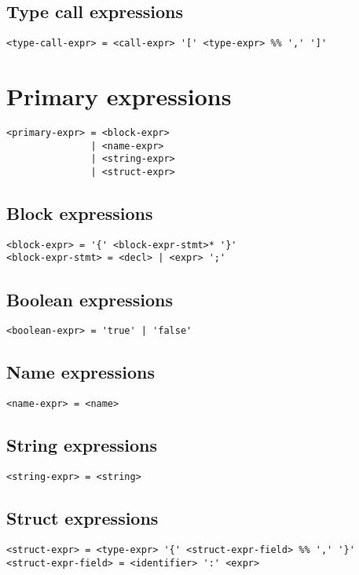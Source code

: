 \documentclass[12pt]{memoir}
\begin{document}
\subsection{Type call expressions}

\begin{verbatim}
<type-call-expr> = <call-expr> '[' <type-expr> %% ',' ']'
\end{verbatim}

\section{Primary expressions}

\begin{verbatim}
<primary-expr> = <block-expr>
               | <name-expr>
               | <string-expr>
               | <struct-expr>
\end{verbatim}

\subsection{Block expressions}

\begin{verbatim}
<block-expr> = '{' <block-expr-stmt>* '}'
<block-expr-stmt> = <decl> | <expr> ';'
\end{verbatim}

\subsection{Boolean expressions}

\begin{verbatim}
<boolean-expr> = 'true' | 'false'
\end{verbatim}

\subsection{Name expressions}

\begin{verbatim}
<name-expr> = <name>
\end{verbatim}

\subsection{String expressions}

\begin{verbatim}
<string-expr> = <string>
\end{verbatim}

\subsection{Struct expressions}

\begin{verbatim}
<struct-expr> = <type-expr> '{' <struct-expr-field> %% ',' '}'
<struct-expr-field> = <identifier> ':' <expr>
\end{verbatim}
\end{document}
